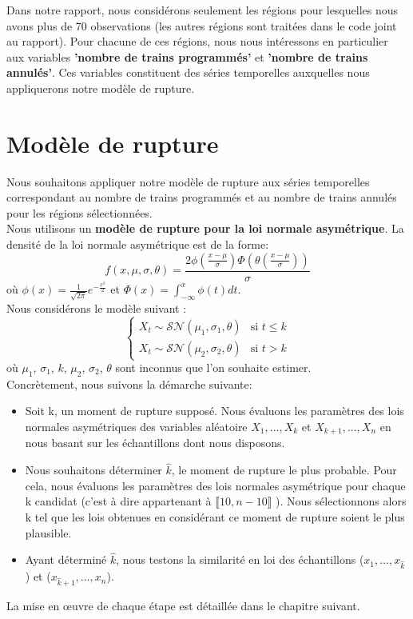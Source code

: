 {Dans notre rapport, nous considérons seulement les régions pour lesquelles nous avons plus de 70 observations (les autres régions sont traitées dans le code joint au rapport). Pour chacune de  ces régions, nous nous intéressons en particulier aux variables \textbf{'nombre de trains programmés'} et\textbf{ 'nombre de trains annulés'}. Ces variables constituent des séries temporelles auxquelles nous appliquerons notre modèle de rupture.

\section{Modèle de rupture}

Nous souhaitons appliquer notre modèle de rupture aux séries temporelles correspondant au nombre de trains programmés et au nombre de trains annulés pour les régions sélectionnées.\\

Nous utilisons un \textbf{modèle de rupture pour la loi normale asymétrique}. La densité de la loi normale asymétrique est de la forme:
\[
f(x,\mu,\sigma,\theta) = \frac{2\phi\left(\frac{x-\mu}{\sigma}\right)\Phi\left(\theta\left(\frac{x-\mu}{\sigma}\right)\right)}{\sigma}
\]
où $\phi(x) = \frac{1}{\sqrt{2\pi}}e^{-\frac{x^2}{2}}$ et $\Phi(x) = \int_{-\infty}^{x} \phi(t)dt$.\\

Nous considérons le modèle suivant :
\[
\begin{cases}
X_t \sim \mathcal{SN}(\mu_1,\sigma_1,\theta) & \text{si } t \leq k \\
X_t \sim \mathcal{SN}(\mu_2,\sigma_2,\theta) & \text{si } t > k
\end{cases}
\]
où $\mu_1$, $\sigma_1$, $k$, $\mu_2$, $\sigma_2$, $\theta$ sont inconnus que l'on souhaite estimer.\\

Concrètement, nous suivons la démarche suivante:

\begin{itemize}
  \item Soit k, un moment de rupture supposé. Nous évaluons les paramètres des lois normales asymétriques des variables aléatoire $X_1, ..., X_k$ et $X_{k+1}, ..., X_n$ en nous basant sur les échantillons dont nous disposons.
  \item Nous souhaitons déterminer $\hat{k}$, le moment de rupture le plus probable. Pour cela, nous évaluons les paramètres des lois normales asymétrique pour chaque k candidat (c'est à dire appartenant à $\llbracket 10, n-10 \rrbracket$ ). Nous sélectionnons alors k tel que les lois obtenues en considérant ce moment de rupture soient le plus plausible.
  \item Ayant déterminé $\hat{k}$, nous testons la similarité en loi des échantillons ($x_1, ..., x_{\hat{k}}$) et ($x_{\hat{k}+1}, ..., x_n$).
\end{itemize}

La mise en œuvre de chaque étape est détaillée dans le chapitre suivant.


}


